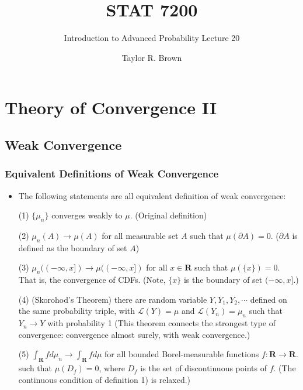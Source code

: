 \documentclass[handout]{beamer}
\title{STAT 7200}
\subtitle{Introduction to Advanced Probability \newline Lecture 20}
\author{Taylor R. Brown}
\institute{}
\date{}
\begin{document}
\frame{\titlepage}


\section[Outline]{}
\frame{\tableofcontents}


\section{Theory of Convergence II}
\subsection{Weak Convergence}



\frame
{
  \frametitle{Equivalent Definitions of Weak Convergence} 

   \begin{itemize}

               \item<1->[] \begin{Theorem} The following statements are all equivalent definition of weak convergence:

               (1) $\{\mu_n\}$ converges weakly to $\mu$. (Original definition) 
               \vspace{2mm}
               
                 {\color{blue} (2) $\mu_n(A)\rightarrow \mu(A)$ for all measurable set $A$ such that $\mu(\partial A)=0$. ($\partial A$ is defined as the boundary of set $A$) }
                              \vspace{2mm}

               (3) $\mu_n((-\infty, x])\rightarrow \mu((-\infty, x])$ for all $x\in \mathbf{R}$ such that $\mu(\{x\})=0$. That is, the convergence of CDFs. (Note, $\{x\}$ is the boundary of set $(-\infty, x]$.)
                              \vspace{2mm}

                 {\color{blue}  (4) (Skorohod's Theorem) there are random variable $Y, Y_1, Y_2, \cdots$ defined on the same probability triple, with $\mathcal{L} (Y)=\mu$ and $\mathcal{L} (Y_n)=\mu_n $ such that $Y_n\rightarrow Y$ with probability 1 (This theorem connects the strongest type of convergence: convergence almost surely, with weak convergence.) }
                              \vspace{2mm}

               (5) $\int_{\mathbf{R}}f d\mu_n \rightarrow \int_{\mathbf{R}}f d\mu$ for all bounded Borel-measurable functions $f:\mathbf{R}\rightarrow \mathbf{R}$. such that $\mu(D_f)=0$, where $D_f$ is the set of discontinuous points of $f$. (The continuous condition of definition 1) is relaxed.)
              
                            \end{Theorem}

                                               \end{itemize}
}
\end{document}
